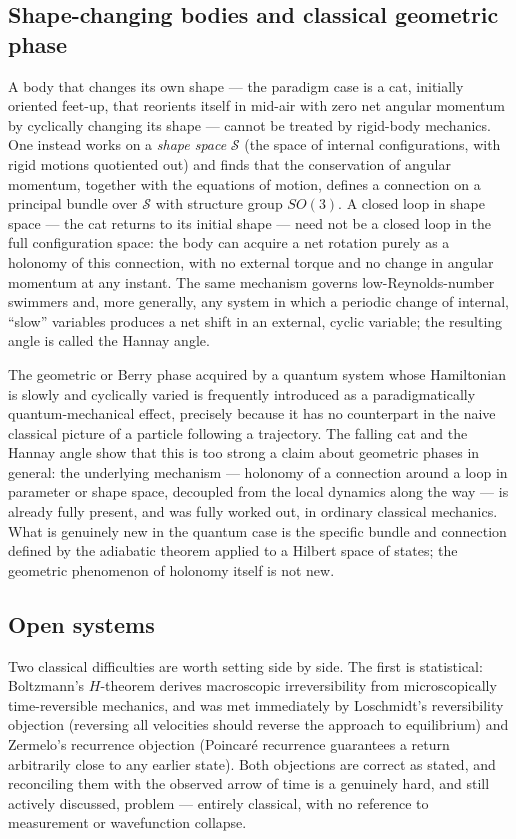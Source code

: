 \subsection{Shape-changing bodies and classical geometric phase}

A body that changes its own shape --- the paradigm case is a cat, initially
oriented feet-up, that reorients itself in mid-air with zero net angular
momentum by cyclically changing its shape --- cannot be treated by rigid-body
mechanics. One instead works on a \emph{shape space} $\mathcal S$ (the space of
internal configurations, with rigid motions quotiented out) and finds that the
conservation of angular momentum, together with the equations of motion,
defines a connection on a principal bundle over $\mathcal S$ with structure
group $SO(3)$. A closed loop in shape space --- the cat returns to its initial
shape --- need not be a closed loop in the full configuration space: the body
can acquire a net rotation purely as a holonomy of this connection, with no
external torque and no change in angular momentum at any instant. The same
mechanism governs low-Reynolds-number swimmers and, more generally, any system
in which a periodic change of internal, ``slow'' variables produces a net shift
in an external, cyclic variable; the resulting angle is called the Hannay angle.

The geometric or Berry phase acquired by a quantum system whose Hamiltonian is
slowly and cyclically varied is frequently introduced as a paradigmatically
quantum-mechanical effect, precisely because it has no counterpart in the naive
classical picture of a particle following a trajectory. The falling cat and the
Hannay angle show that this is too strong a claim about geometric phases in
general: the underlying mechanism --- holonomy of a connection around a loop in
parameter or shape space, decoupled from the local dynamics along the way --- is
already fully present, and was fully worked out, in ordinary classical
mechanics. What is genuinely new in the quantum case is the specific bundle and
connection defined by the adiabatic theorem applied to a Hilbert space of
states; the geometric phenomenon of holonomy itself is not new.

\subsection{Open systems}

Two classical difficulties are worth setting side by side. The first is
statistical: Boltzmann's $H$-theorem derives macroscopic irreversibility from
microscopically time-reversible mechanics, and was met immediately by
Loschmidt's reversibility objection (reversing all velocities should reverse
the approach to equilibrium) and Zermelo's recurrence objection (Poincar\'e
recurrence guarantees a return arbitrarily close to any earlier state). Both
objections are correct as stated, and reconciling them with the observed arrow
of time is a genuinely hard, and still actively discussed, problem --- entirely
classical, with no reference to measurement or wavefunction collapse.

